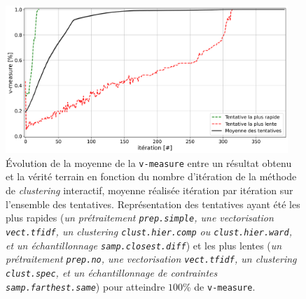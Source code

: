 			\begin{figure}[!htb]
				\centering
				\includegraphics[width=0.95\textwidth]{figures/etude-efficacite-evolution-moyenne-0par-iteration}
				\caption{Évolution de la moyenne de la \texttt{v-measure} entre un résultat obtenu et la vérité terrain en fonction du nombre d'itération de la méthode de \textit{clustering} interactif, moyenne réalisée itération par itération sur l'ensemble des tentatives.
				Représentation des tentatives ayant été les plus rapides (\textit{un prétraitement \texttt{prep.simple}, une vectorisation \texttt{vect.tfidf}, un \textit{clustering} \texttt{clust.hier.comp} ou \texttt{clust.hier.ward}, et un échantillonnage \texttt{samp.closest.diff}}) et les plus lentes (\textit{un prétraitement \texttt{prep.no}, une vectorisation \texttt{vect.tfidf}, un \textit{clustering} \texttt{clust.spec}, et un échantillonnage de contraintes \texttt{samp.farthest.same}}) pour atteindre $100$\% de \texttt{v-measure}.}
				\label{figure:4.1.1-ETUDE-CONVERGENCE-EVOLUTION}
			\end{figure}
